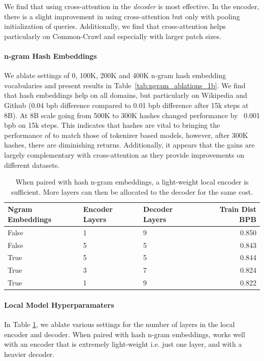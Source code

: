 \documentclass[]{fairmeta}
\begin{document}
We find that using cross-attention in the \textit{decoder} is most effective. In the encoder, there is a slight improvement in using cross-attention but only with pooling initialization of queries. Additionally, we find that cross-attention helps particularly on Common-Crawl and especially with larger patch sizes.

\paragraph{n-gram Hash Embeddings} 

We ablate settings of 0, 100K, 200K and 400K n-gram hash embedding vocabularies and present results in Table~\ref{tab:ngram_ablations_1b}. We find that hash embeddings help on all domains, but particularly on Wikipedia and Github (0.04 bpb difference compared to 0.01 bpb difference after 15k steps at 8B).
At 8B scale going from 500K to 300K hashes changed performance by ~0.001 bpb on 15k steps. This indicates that hashes are vital to bringing the performance of \model{} to match those of tokenizer based models, however, after 300K hashes, there are diminishing returns. Additionally, it appears that the gains are largely complementary with cross-attention as they provide improvements on different datasets.

\begin{table}[t]
\centering

\begin{tabular}{@{}lllr@{}}
\toprule

Ngram Embeddings & Encoder Layers & Decoder Layers & Train Dist BPB \\

\midrule
False &      1 &        9 &       0.850 \\
False &      5 &        5 &       0.843 \\
\midrule
True  &      5 &        5 &       0.844 \\
True  &      3 &        7 &       0.824 \\
True  &      1 &        9 &       0.822 \\
\bottomrule
\end{tabular}

\caption{
When paired with hash n-gram embeddings, a light-weight local encoder is sufficient. More layers can then be allocated to the decoder for the same cost.
}
\label{tab:local_layers}
\end{table}

\paragraph{Local Model Hyperparamaters} 
In Table \ref{tab:local_layers}, we ablate various settings for the number of layers in the local encoder and decoder. When paired with hash n-gram embeddings, \model{} works well with an encoder that is extremely light-weight i.e. just one layer, and with a heavier decoder.
\end{document}
